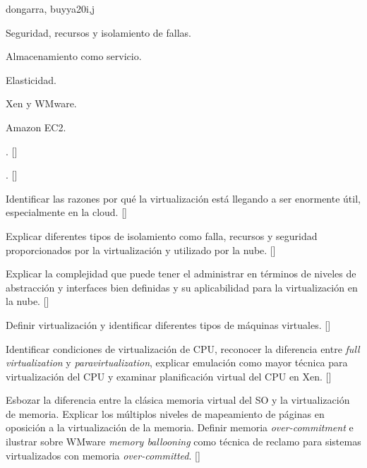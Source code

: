 \begin{syllabus}
\begin{unit}{\PDCloudComputing}{}{dongarra, buyya}{20}{i,j}
\begin{topics}
    \item \PDCloudComputingTopicVirtualization
    \item Seguridad, recursos y isolamiento de fallas.
    \item Almacenamiento como servicio.
    \item Elasticidad.
    \item Xen y WMware.
    \item Amazon EC2.
\end{topics}
\begin{learningoutcomes}
    \item \PDCloudComputingTopicVirtualization. [\Familiarity]
    \item \PDCloudComputingLOExplainTheDisadvantages. [\Familiarity]
    \item Identificar las razones por qué la virtualización está llegando a ser enormente útil, especialmente en la cloud. [\Familiarity]
    \item Explicar diferentes tipos de isolamiento como falla, recursos y seguridad proporcionados por la virtualización y utilizado por la nube. [\Familiarity]
    \item Explicar la complejidad que puede tener el administrar en términos de niveles de abstracción y interfaces bien definidas y su aplicabilidad para la virtualización en la nube.  [\Familiarity]
    \item Definir virtualización y identificar diferentes tipos de máquinas virtuales. [\Familiarity]
    \item Identificar condiciones de virtualización de CPU, reconocer la diferencia entre {\em full virtualization} y {\em paravirtualization}, explicar emulación como mayor técnica para virtualización del CPU y examinar planificación virtual del CPU en Xen. [\Familiarity]
    \item Esbozar la diferencia entre la clásica memoria virtual del SO y la virtualización de memoria. Explicar los múltiplos niveles de mapeamiento de páginas en oposición a la virtualización de la memoria. Definir memoria {\em over-commitment} e ilustrar sobre WMware {\em memory ballooning} como técnica de reclamo para sistemas virtualizados con memoria {\em over-committed}. [\Familiarity]
\end{learningoutcomes}
\end{unit}


\end{syllabus}
